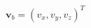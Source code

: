 \documentclass[preview]{standalone}
\begin{document}
\begin{center}
$\mathbf{v}_b = (v_x, v_y, v_z)^T$
\end{center}
\end{document}
